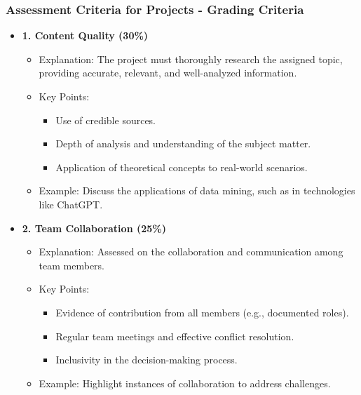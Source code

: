 \documentclass[aspectratio=169]{beamer}
\begin{document}
\begin{frame}[fragile]
    \frametitle{Assessment Criteria for Projects - Grading Criteria}
    \begin{itemize}
        \item \textbf{1. Content Quality (30\%)}
            \begin{itemize}
                \item Explanation: The project must thoroughly research the assigned topic, providing accurate, relevant, and well-analyzed information.
                \item Key Points:
                    \begin{itemize}
                        \item Use of credible sources.
                        \item Depth of analysis and understanding of the subject matter.
                        \item Application of theoretical concepts to real-world scenarios.
                    \end{itemize}
                \item Example: Discuss the applications of data mining, such as in technologies like ChatGPT.
            \end{itemize}

        \item \textbf{2. Team Collaboration (25\%)}
            \begin{itemize}
                \item Explanation: Assessed on the collaboration and communication among team members.
                \item Key Points:
                    \begin{itemize}
                        \item Evidence of contribution from all members (e.g., documented roles).
                        \item Regular team meetings and effective conflict resolution.
                        \item Inclusivity in the decision-making process.
                    \end{itemize}
                \item Example: Highlight instances of collaboration to address challenges.
            \end{itemize}
    \end{itemize}
\end{frame}
\end{document}
